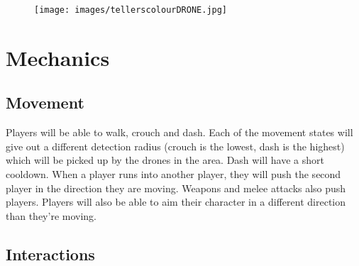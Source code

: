 \documentclass[10pt]{report}
\begin{document}
\begin{figure}[H]
    \texttt{[image: images/tellerscolourDRONE.jpg]}
\end{figure}

\section{Mechanics}

\subsection{Movement}

Players will be able to walk, crouch and dash. Each of the movement states will give out a different detection radius (crouch is the lowest, dash is the highest) which will be picked up by the drones in the area. Dash will have a short cooldown. When a player runs into another player, they will push the second player in the direction they are moving. Weapons and melee attacks also push players. Players will also be able to aim their character in a different direction than they’re moving.

\subsection{Interactions}
\end{document}
